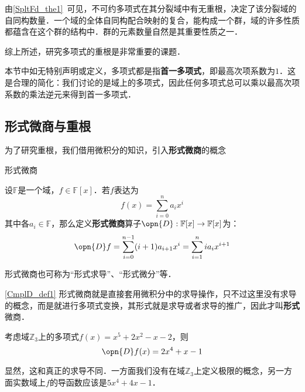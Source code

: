 


由\autoref{SpltFd_the1}~可见，不可约多项式在其分裂域中有无重根，决定了该分裂域的自同构数量．一个域的全体自同构配合映射的复合，能构成一个群，域的许多性质都蕴含在这个群的结构中．群的元素数量自然是其重要性质之一．

综上所述，研究多项式的重根是非常重要的课题．

本节中如无特别声明或定义，多项式都是指\textbf{首一多项式}，即最高次项系数为$1$．这是合理的简化：我们讨论的是域上的多项式，因此任何多项式总可以乘以最高次项系数的乘法逆元来得到首一多项式．

\subsection{形式微商与重根}

为了研究重根，我们借用微积分的知识，引入\textbf{形式微商}的概念

\begin{definition}{形式微商}\label{CmplD_def1}

设$\mathbb{F}$是一个域，$f\in\mathbb{F}[x]$．若$f$表达为
\begin{equation}
f(x) = \sum_{i=0}^n a_ix^i
\end{equation}
其中各$a_i\in\mathbb{F}$，那么定义\textbf{形式微商}算子$\opn{D}:\mathbb{F}[x]\to\mathbb{F}[x]$为：
\begin{equation}
\opn{D}f = \sum_{i=0}^{n-1} (i+1)a_{i+1}x^i = \sum_{i=1}^{n} ia_{i}x^{i+1}
\end{equation}

形式微商也可称为“形式求导”、“形式微分”等．

\end{definition}

\autoref{CmplD_def1} 形式微商就是直接套用微积分中的求导操作，只不过这里没有求导的概念，而是就进行多项式变换，其形式就是求导或者求导的推广，因此才叫\textbf{形式}微商．

\begin{example}{}
考虑域$\mathbb{Z}_3$上的多项式$f(x)=x^5+2x^2-x-2$，则
\begin{equation}
\opn{D}f(x) = 2x^4+x-1
\end{equation}

显然，这和真正的求导不同．一方面我们没有在域$\mathbb{Z}_3$上定义极限的概念，另一方面实数域上$f$的导函数应该是$5x^4+4x-1$．
\end{example}

